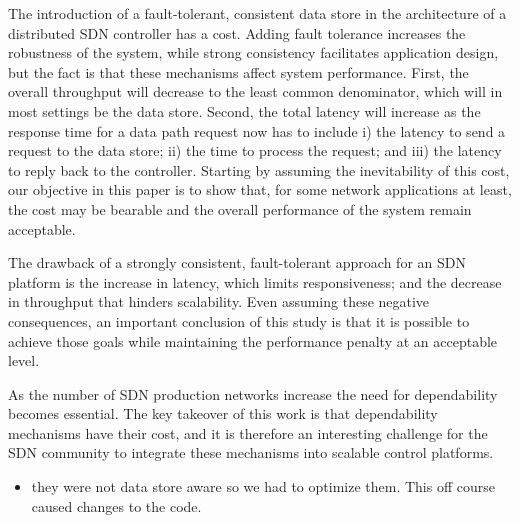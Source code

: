 The introduction of a fault-tolerant, consistent data store in the architecture of a distributed SDN controller has a cost.
Adding fault tolerance increases the robustness of the system, while strong consistency facilitates application design, but the fact is that these mechanisms affect system performance.
First, the overall throughput will decrease to the least common denominator, which will in most settings be the data store.
Second, the total latency will increase as the response time for a data path request now has to include i) the latency to send a request to the data store; ii) the time to process the request; and iii) the latency to reply back to the controller.
Starting by assuming the inevitability of this cost, our objective in this paper is to show that, for some network applications at least, the cost may be bearable and the overall performance of the system remain acceptable.


The drawback of a strongly consistent, fault-tolerant approach for an SDN platform is the increase in latency, which limits responsiveness; and the decrease in throughput that hinders scalability.
Even assuming these negative consequences, an important conclusion of this study is that it is possible to achieve those goals while maintaining the performance penalty at an acceptable level.


As the number of SDN production networks increase the need for dependability becomes essential. The key takeover of this work is that dependability mechanisms have their cost, and it is therefore an interesting challenge for the SDN community to integrate these mechanisms into scalable control platforms. 

\begin{itemize}
\item they were not data store aware so we had to optimize them. This off course caused changes to the code.
\end{itemize}

